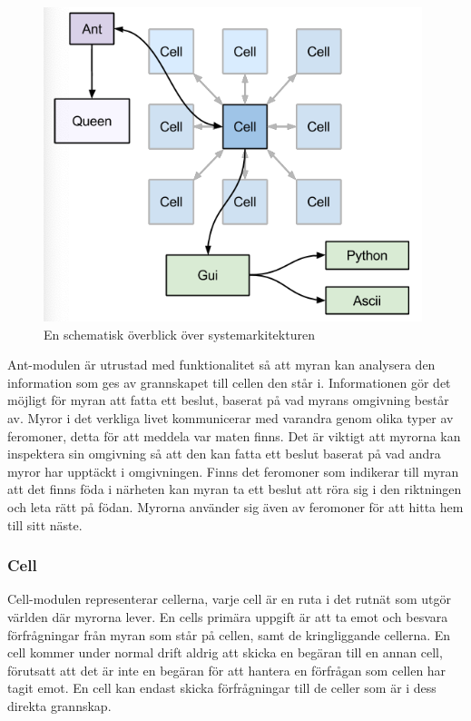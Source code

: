 \documentclass[12pt]{article}
\begin{document}
\begin{figure}
    \centering
    \includegraphics[width=\textwidth]{BugsLife-Fig2.png}
    \caption{En schematisk överblick över systemarkitekturen}
    \label{fig:sysark-overview}
\end{figure}

Ant-modulen är utrustad med funktionalitet så att myran kan analysera den information som ges av grannskapet till cellen den står i.
Informationen gör det möjligt för myran att fatta ett beslut,
baserat på vad myrans omgivning består av.
Myror i det verkliga livet kommunicerar med varandra genom olika typer av feromoner,
detta för att meddela var maten finns.
Det är viktigt att myrorna kan inspektera sin omgivning så att den kan fatta ett beslut baserat på vad andra myror har upptäckt i omgivningen.
Finns det feromoner som indikerar till myran att det finns föda i närheten kan myran ta ett beslut att röra sig i den riktningen och leta rätt på födan.
Myrorna använder sig även av feromoner för att hitta hem till sitt näste.

\subsubsection{Cell}
Cell-modulen representerar cellerna,
varje cell är en ruta i det rutnät som utgör världen där myrorna lever.
En cells primära uppgift är att ta emot och besvara förfrågningar från myran som står på cellen,
samt de kringliggande cellerna.
En cell kommer under normal drift aldrig att skicka en begäran till en annan cell,
förutsatt att det är inte en begäran för att hantera en förfrågan som cellen har tagit emot.
En cell kan endast skicka förfrågningar till de celler som är i dess direkta grannskap.
\end{document}
